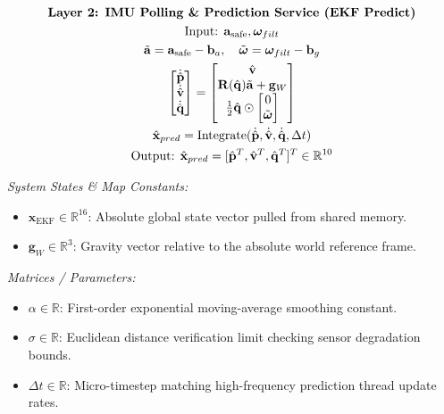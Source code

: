 \documentclass{article}
\begin{document}
\begin{tcolorbox}[colback=gray!5, colframe=black, arc=2mm, title=\textbf{High-Frequency IMU \& Prediction Thread ($T_2$) Architecture Stack}, center title]
$$
\begin{gathered}
    \text{\textbf{Layer 2: IMU Polling \& Prediction Service (EKF Predict)}} \\
    \text{Input: } \mathbf{a}_{\text{safe}}, \boldsymbol{\omega}_{filt} \\
    \tilde{\mathbf{a}} = \mathbf{a}_{\text{safe}} - \mathbf{b}_a, \quad \tilde{\boldsymbol{\omega}} = \boldsymbol{\omega}_{filt} - \mathbf{b}_g \\
    \begin{bmatrix} \dot{\hat{\mathbf{p}}} \\ \dot{\hat{\mathbf{v}}} \\ \dot{\hat{\mathbf{q}}} \end{bmatrix} = \begin{bmatrix} \hat{\mathbf{v}} \\ \mathbf{R}(\hat{\mathbf{q}})\tilde{\mathbf{a}} + \mathbf{g}_W \\ \frac{1}{2} \hat{\mathbf{q}} \odot \begin{bmatrix} 0 \\ \tilde{\boldsymbol{\omega}} \end{bmatrix} \end{bmatrix} \\
    \hat{\mathbf{x}}_{pred} = \text{Integrate}(\dot{\hat{\mathbf{p}}}, \dot{\hat{\mathbf{v}}}, \dot{\hat{\mathbf{q}}}, \Delta t) \\
    \text{Output: } \hat{\mathbf{x}}_{pred} = [\hat{\mathbf{p}}^T, \hat{\mathbf{v}}^T, \hat{\mathbf{q}}^T]^T \in \mathbb{R}^{10}
\end{gathered}
$$
\end{tcolorbox}

\small
\noindent\textit{System States \& Map Constants:}
\begin{itemize}
    \item $\mathbf{x}_{\text{EKF}} \in \mathbb{R}^{16}$: Absolute global state vector pulled from shared memory.
    \item $\mathbf{g}_W \in \mathbb{R}^3$: Gravity vector relative to the absolute world reference frame.
\end{itemize}

\noindent\textit{Matrices / Parameters:}
\begin{itemize}
    \item $\alpha \in \mathbb{R}$: First-order exponential moving-average smoothing constant.
    \item $\sigma \in \mathbb{R}$: Euclidean distance verification limit checking sensor degradation bounds.
    \item $\Delta t \in \mathbb{R}$: Micro-timestep matching high-frequency prediction thread update rates.
\end{itemize}
\end{document}
